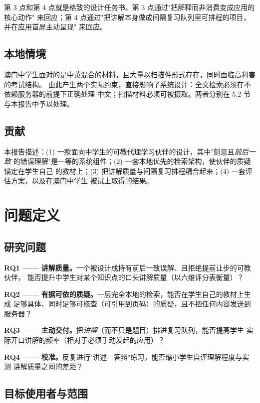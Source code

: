 \documentclass[11pt,a4paper,UTF8,fontset=windows]{ctexart}
\begin{document}
第 3 点和第 4 点就是格致的设计任务书。第 3 点通过"把解释而非消费变成应用的核心动作"
来回应；第 4 点通过"把讲解本身做成间隔复习队列里可排程的项目，并在应用首屏主动呈现"
来回应。

\subsection{本地情境}

澳门中学生面对的是中英混合的材料，且大量以扫描件形式存在，同时面临高利害的考试结构。
由此产生两个实际约束，直接影响了系统设计：全文检索必须在不依赖服务器的前提下正确处理
中文；扫描材料必须可被摄取。两者分别在 5.2 节与本报告中予以处理。

\subsection{贡献}

本报告描述：(1) 一款面向中学生的可教代理学习伙伴的设计，其中"刻意且\emph{前后一致}
的错误理解"是一等的系统组件；(2) 一套本地优先的检索架构，使伙伴的质疑锚定在学生自己
的教材上；(3) 把讲解质量与间隔复习排程耦合起来；(4) 一套评估方案，以及在澳门中学生
被试上取得的结果。

\section{问题定义}

\subsection{研究问题}

\textbf{RQ1 —— 讲解质量。}一个被设计成持有前后一致误解、且拒绝提前让步的可教伙伴，
能否提升中学生对某个知识点的口头讲解质量（以六维评分表衡量）？

\textbf{RQ2 —— 有据可依的质疑。}一层完全本地的检索，能否在学生自己的教材上生成
足够具体、同时足够可核查（可引用到页码）的质疑，且不把任何内容发送到服务器？

\textbf{RQ3 —— 主动交付。}把\emph{讲解}（而不只是题目）排进复习队列，能否提高学生
实际开口讲解的频率（相对于必须手动发起的应用）？

\textbf{RQ4 —— 校准。}反复进行"讲述—答辩"练习，能否缩小学生自评理解程度与实测
讲解质量之间的差距？

\subsection{目标使用者与范围}
\end{document}
